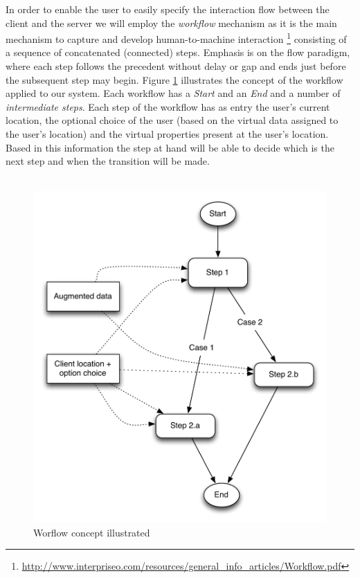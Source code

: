 In order to enable the user to easily specify the interaction flow between the client and the server we will employ the \emph{workflow} mechanism as it is the main mechanism to  capture and develop human-to-machine interaction \footnote{\url{http://www.interpriseo.com/resources/general_info_articles/Workflow.pdf}} consisting of a sequence of concatenated (connected) steps. Emphasis is on the flow paradigm, where each step follows the precedent without delay or gap and ends just before the subsequent step may begin. Figure \ref{fig.design.workflow} illustrates the concept of the workflow applied to our system. Each workflow has a \emph{Start} and an \emph{End} and a number of \emph{intermediate steps}. Each step of the workflow has as entry the user's current location, the optional choice of the user (based on the virtual data assigned to the user's location) and the virtual properties present at the user's location. Based in this information the step at hand will be able to decide which is the next step and when the transition will be made.
\\\\
\begin{figure}[H]
	\centering
	\includegraphics[width=0.9\linewidth]{fig/workflow}
	\caption{Worflow concept illustrated}
	\label{fig.design.workflow}
\end{figure}
